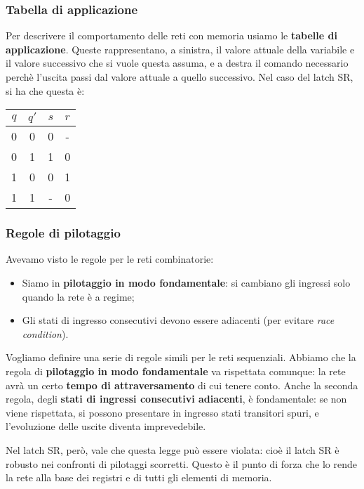 \documentclass[a4paper,11pt]{article}
\begin{document}
\subsubsection{Tabella di applicazione}
Per descrivere il comportamento delle reti con memoria usiamo le \textbf{tabelle di applicazione}.
Queste rappresentano, a sinistra, il valore attuale della variabile e il valore successivo che si vuole questa assuma, e a destra il comando necessario perchè l'uscita passi dal valore attuale a quello successivo.
Nel caso del latch SR, si ha che questa è:
\begin{table}[h!]
	\center 
	\begin{tabular} { c c | c c }
		\bfseries $q$ & \bfseries $q'$ & \bfseries $s$ & \bfseries $r$ \\
		\hline 
		0 & 0 & 0 & - \\ 
		0 & 1 & 1 & 0 \\ 
		1 & 0 & 0 & 1 \\ 
		1 & 1 & - & 0 
	\end{tabular}
\end{table}

\subsubsection{Regole di pilotaggio}
Avevamo visto le regole per le reti combinatorie:
\begin{itemize}
	\item Siamo in \textbf{pilotaggio in modo fondamentale}: si cambiano gli ingressi solo quando la rete è a regime;
	\item Gli stati di ingresso consecutivi devono essere adiacenti (per evitare \textit{race condition}).
\end{itemize}

Vogliamo definire una serie di regole simili per le reti sequenziali.
Abbiamo che la regola di \textbf{pilotaggio in modo fondamentale} va rispettata comunque: la rete avrà un certo \textbf{tempo di attraversamento} di cui tenere conto.
Anche la seconda regola, degli \textbf{stati di ingressi consecutivi adiacenti}, è fondamentale: se non viene rispettata, si possono presentare in ingresso stati transitori spuri, e l'evoluzione delle uscite diventa imprevedebile.

Nel latch SR, però, vale che questa legge può essere violata: cioè il latch SR è robusto nei confronti di pilotaggi scorretti.
Questo è il punto di forza che lo rende la rete alla base dei registri e di tutti gli elementi di memoria.
\end{document}
